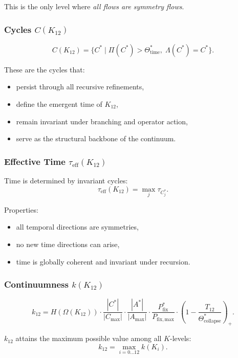 This is the only level where \emph{all flows are symmetry flows}.

\subsubsection{Cycles $C(K_{12})$}

\[
C(K_{12}) = \{ C^*\mid \Pi(C^*)>\Theta_{\mathrm{time}}^*,\;
\Lambda(C^*)=C^*\}.
\]

These are the cycles that:
\begin{itemize}
    \item persist through all recursive refinements,
    \item define the emergent time of $K_{12}$,
    \item remain invariant under branching and operator action,
    \item serve as the structural backbone of the continuum.
\end{itemize}

\subsubsection{Effective Time $\tau_{\mathrm{eff}}(K_{12})$}

Time is determined by invariant cycles:
\[
\tau_{\mathrm{eff}}(K_{12}) = \max_j \tau_{C_j^*}.
\]

Properties:
\begin{itemize}
    \item all temporal directions are symmetries,
    \item no new time directions can arise,
    \item time is globally coherent and invariant under recursion.
\end{itemize}

\subsubsection{Continuumness $k(K_{12})$}

\[
k_{12} =
H(\Omega(K_{12}))
\cdot
\frac{|C^*|}{|C_{\max}|}
\cdot
\frac{|A^*|}{|A_{\max}|}
\cdot
\frac{P_{\mathrm{fix}}^*}{P_{\mathrm{fix,max}}}
\cdot
\left(1-\frac{T_{12}}{\Theta^*_{\mathrm{collapse}}}\right)_+.
\]

$k_{12}$ attains the maximum possible value among all $K$-levels:
\[
k_{12} = \max_{i=0\dots12} k(K_i).
\]

